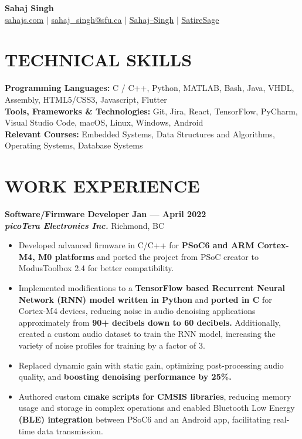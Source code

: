\documentclass[letterpaper,11pt]{article}
\newcommand{\contact} [5] {
    \begin{center}
        \textbf{\color{colorValue}\Huge #1} \\ \vspace{1pt}
        \small \href{https://#2}{\faIcon{code} \underline{#2}} $|$ \href{mailto:#3}{\faIcon{envelope} \underline{#3}} $|$ 
        \href{#4}{\faIcon{linkedin} \underline{Sahaj--Singh}} $|$
        \href{#5}{\faIcon{github} \underline{SatireSage}}
    \end{center}
}
\newcommand{\Item} [1] {
    \item\small{{#1 \vspace{-2pt}}}
}
\newcommand{\employer} [5] {
    {\textbf{#3} \hfill \textbf{#4 --- #5}\\ \textbf{\emph{#1}} \hfill #2\\}
}
\newcommand{\workItemListStart} [0] {
    \vspace{-1pt}
    \begin{itemize}[topsep=0pt,itemsep=-2pt]
}
\newcommand{\workItemListEnd} [0] {
    \end{itemize}
    \vspace{1pt}
}
\begin{document}
    \vspace*{-30pt}

    \contact{Sahaj Singh}{sahajs.com}{sahaj\_singh@sfu.ca}{https://www.linkedin.com/in/sahaj--singh/}{https://github.com/SatireSage}

    \section{TECHNICAL SKILLS}
    \begin{itemize}[leftmargin=0in, label={}]
    \small{\item{
        \textbf{Programming Languages:}{ C / C++, Python, MATLAB, Bash, Java, VHDL, Assembly, HTML5/CSS3, Javascript, Flutter} \\
        \textbf{Tools, Frameworks \& Technologies:}{ Git, Jira, React, TensorFlow, PyCharm, Visual Studio Code, macOS, Linux, Windows, Android} \\
        \textbf{Relevant Courses:}{ Embedded Systems, Data Structures and Algorithms, Operating Systems, Database Systems} \\
    }}
    \end{itemize}

    \section{WORK EXPERIENCE}
    \employer{picoTera Electronics Inc.}{Richmond, BC}{Software/Firmware Developer}{Jan}{April 2022}
    \workItemListStart{}
        \Item{Developed advanced firmware in C/C++ for \textbf{PSoC6 and ARM Cortex-M4, M0 platforms} and ported the project from PSoC creator to ModusToolbox 2.4 for better compatibility.}
        \Item{Implemented modifications to a \textbf{TensorFlow based Recurrent Neural Network (RNN) model written in Python} and \textbf{ported in C} for Cortex-M4 devices, reducing noise in audio denoising applications approximately from \textbf{90+ decibels down to 60 decibels.} Additionally, created a custom audio dataset to train the RNN model, increasing the variety of noise profiles for training by a factor of 3.}
        \Item{Replaced dynamic gain with static gain, optimizing post-processing audio quality, and \textbf{boosting denoising performance by 25\%.}}
        \Item{Authored custom \textbf{cmake scripts for CMSIS libraries}, reducing memory usage and storage in complex operations and enabled Bluetooth Low Energy \textbf{(BLE) integration} between PSoC6 and an Android app, facilitating real-time data transmission.}
    \workItemListEnd{}
\end{document}
